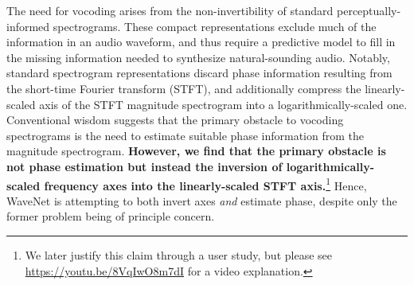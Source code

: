 \documentclass[a4paper]{article}
\begin{document}



The need for vocoding arises from the non-invertibility of standard perceptually-informed spectrograms. 
These compact representations
exclude much of the information in an audio waveform, 
and thus require a predictive model to fill in the missing information needed to synthesize natural-sounding audio. 
Notably, standard spectrogram representations discard phase information resulting from the short-time Fourier transform (STFT), 
and additionally compress the linearly-scaled axis of the STFT magnitude spectrogram into a logarithmically-scaled one. 
Conventional wisdom suggests that the primary obstacle to vocoding spectrograms is the need to estimate suitable phase information from the magnitude spectrogram. 
\textbf{However, we find that the primary obstacle is not phase estimation but instead the inversion of logarithmically-scaled frequency axes into the linearly-scaled STFT axis.}\footnote{We later justify this claim through a user study, but please see \url{https://youtu.be/8VqIwO8m7dI} for a video explanation.}
Hence, WaveNet is attempting to both invert axes \emph{and} estimate phase, despite only the former problem being of principle concern.
\end{document}
